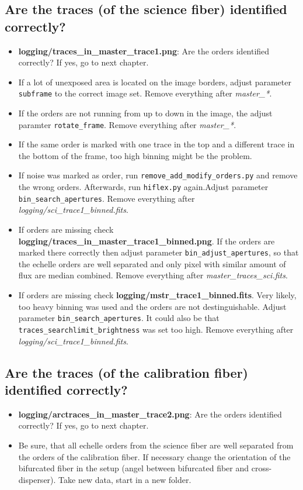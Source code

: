 \documentclass[10pt,a4paper]{article}
\begin{document}
\subsection{Are the traces (of the science fiber) identified correctly?}
\begin{itemize}
  \item \textbf{logging/traces\_in\_master\_trace1.png}: Are the orders identified correctly? If yes, go to next chapter.
  \item If a lot of unexposed area is located on the image borders, adjust parameter \verb|subframe| to the correct image set. Remove everything after \textit{master\_*}.
  \item If the orders are not running from up to down in the image, the adjust paramter \verb|rotate_frame|.  Remove everything after \textit{master\_*}.
  \item If the same order is marked with one trace in the top and a different trace in the bottom of the frame, too high binning might be the problem. 
  \item If noise was marked as order, run \verb|remove_add_modify_orders.py| and remove the wrong orders. Afterwards, run \verb|hiflex.py| again.Adjust parameter \verb|bin_search_apertures|. Remove everything after \textit{logging/sci\_trace1\_binned.fits}.
  \item If orders are missing check \textbf{logging/traces\_in\_master\_trace1\_binned.png}. If the orders are marked there correctly then adjust parameter \verb|bin_adjust_apertures|, so that the echelle orders are well separated and only pixel with similar amount of flux are median combined. Remove everything after \textit{master\_traces\_sci.fits}.
  \item If orders are missing check \textbf{logging/mstr\_trace1\_binned.fits}. Very likely, too heavy binning was used and the orders are not destinguishable. Adjust parameter \verb|bin_search_apertures|. It could also be that \verb|traces_searchlimit_brightness| was set too high. Remove everything after \textit{logging/sci\_trace1\_binned.fits}.
\end{itemize}


\subsection{Are the traces (of the calibration fiber) identified correctly?}
\begin{itemize}
  \item \textbf{logging/arctraces\_in\_master\_trace2.png}: Are the orders identified correctly? If yes, go to next chapter.
  \item Be sure, that all echelle orders from the science fiber are well separated from the orders of the calibration fiber. If necessary change the orientation of the bifurcated fiber in the setup (angel between bifurcated fiber and cross-disperser). Take new data, start in a new folder.
\end{itemize}
\end{document}
